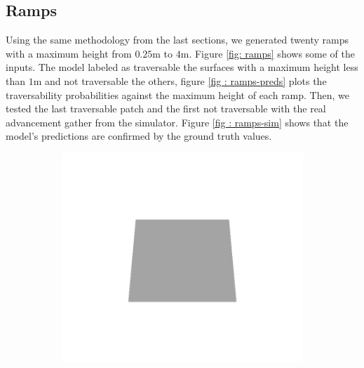 \documentclass[../document.tex]{subfiles}
\begin{document}
\subsection{Ramps}
Using the same methodology from the last sections, we generated twenty ramps with a maximum height from $0.25$m to $4$m. Figure \ref{fig: ramps} shows some of the inputs. The model labeled as traversable the surfaces with a maximum height less than $1$m and not traversable the others, figure \ref{fig : ramps-preds} plots the traversability probabilities against the maximum height of each ramp. Then, we tested the last traversable patch and the first not traversable with the real advancement gather from the simulator. Figure \ref{fig : ramps-sim} shows that the model's predictions are confirmed by the ground truth values. 
\begin{figure}[htbp]
    \centering
    \begin{subfigure}[b]{0.24\textwidth}
    \includegraphics[width=\linewidth]{../img/5/custom_patches/ramp/all/00-3d.png}
    \end{subfigure}
    \begin{subfigure}[b]{0.24\textwidth}

\end{subfigure}
\end{figure}
\end{document}
